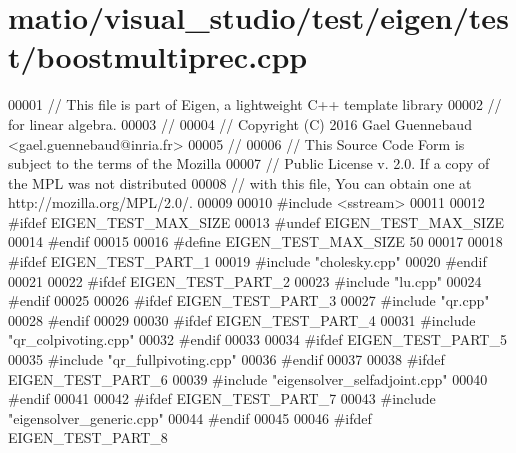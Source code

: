 \hypertarget{matio_2visual__studio_2test_2eigen_2test_2boostmultiprec_8cpp_source}{}\section{matio/visual\+\_\+studio/test/eigen/test/boostmultiprec.cpp}
\label{matio_2visual__studio_2test_2eigen_2test_2boostmultiprec_8cpp_source}

\begin{DoxyCode}
00001 \textcolor{comment}{// This file is part of Eigen, a lightweight C++ template library}
00002 \textcolor{comment}{// for linear algebra.}
00003 \textcolor{comment}{//}
00004 \textcolor{comment}{// Copyright (C) 2016 Gael Guennebaud <gael.guennebaud@inria.fr>}
00005 \textcolor{comment}{//}
00006 \textcolor{comment}{// This Source Code Form is subject to the terms of the Mozilla}
00007 \textcolor{comment}{// Public License v. 2.0. If a copy of the MPL was not distributed}
00008 \textcolor{comment}{// with this file, You can obtain one at http://mozilla.org/MPL/2.0/.}
00009 
00010 \textcolor{preprocessor}{#include <sstream>}
00011 
00012 \textcolor{preprocessor}{#ifdef EIGEN\_TEST\_MAX\_SIZE}
00013 \textcolor{preprocessor}{#undef EIGEN\_TEST\_MAX\_SIZE}
00014 \textcolor{preprocessor}{#endif}
00015 
00016 \textcolor{preprocessor}{#define EIGEN\_TEST\_MAX\_SIZE 50}
00017 
00018 \textcolor{preprocessor}{#ifdef EIGEN\_TEST\_PART\_1}
00019 \textcolor{preprocessor}{#include "cholesky.cpp"}
00020 \textcolor{preprocessor}{#endif}
00021 
00022 \textcolor{preprocessor}{#ifdef EIGEN\_TEST\_PART\_2}
00023 \textcolor{preprocessor}{#include "lu.cpp"}
00024 \textcolor{preprocessor}{#endif}
00025 
00026 \textcolor{preprocessor}{#ifdef EIGEN\_TEST\_PART\_3}
00027 \textcolor{preprocessor}{#include "qr.cpp"}
00028 \textcolor{preprocessor}{#endif}
00029 
00030 \textcolor{preprocessor}{#ifdef EIGEN\_TEST\_PART\_4}
00031 \textcolor{preprocessor}{#include "qr\_colpivoting.cpp"}
00032 \textcolor{preprocessor}{#endif}
00033 
00034 \textcolor{preprocessor}{#ifdef EIGEN\_TEST\_PART\_5}
00035 \textcolor{preprocessor}{#include "qr\_fullpivoting.cpp"}
00036 \textcolor{preprocessor}{#endif}
00037 
00038 \textcolor{preprocessor}{#ifdef EIGEN\_TEST\_PART\_6}
00039 \textcolor{preprocessor}{#include "eigensolver\_selfadjoint.cpp"}
00040 \textcolor{preprocessor}{#endif}
00041 
00042 \textcolor{preprocessor}{#ifdef EIGEN\_TEST\_PART\_7}
00043 \textcolor{preprocessor}{#include "eigensolver\_generic.cpp"}
00044 \textcolor{preprocessor}{#endif}
00045 
00046 \textcolor{preprocessor}{#ifdef EIGEN\_TEST\_PART\_8}

\end{DoxyCode}
